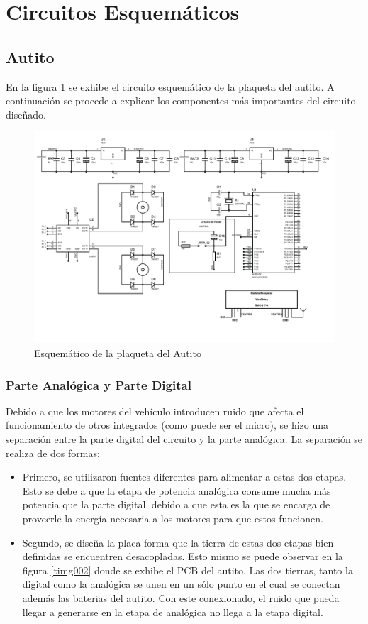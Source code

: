 \documentclass[a4paper,10pt]{article}
\begin{document}
	\section{Circuitos Esquemáticos}
		\subsection{Autito}
			En la figura \ref{timg001} se exhibe el circuito esquemático de la plaqueta del autito. A continuación se procede a explicar los componentes más 
			importantes del circuito diseñado.

			\begin{figure}[!htb]
				\centering
				\includegraphics[width=14cm]{Imagenes/EsquematicoAuto.PDF}
				\caption{Esquemático de la plaqueta del Autito} \label{timg001}
			\end{figure}

				\subsubsection{Parte Analógica y Parte Digital}
					Debido a que los motores del vehículo introducen ruido que afecta el funcionamiento de otros integrados (como puede ser el micro), se hizo una 
					separación entre la parte digital del circuito y la parte analógica. La separación se realiza de dos formas: 
			
					\begin{itemize}
						\item Primero, se utilizaron fuentes diferentes para alimentar a estas dos etapas. Esto se debe a que la etapa de potencia analógica consume
						mucha más potencia que la parte digital, debido a que esta es la que se encarga de proveerle la energía necesaria a los motores para que 
						estos funcionen.
						\item Segundo, se diseña la placa forma que la tierra de estas dos etapas bien definidas se encuentren desacopladas. Esto mismo se puede observar
						en la figura \ref{timg002} donde se exhibe el PCB del autito. Las dos tierras, tanto la digital como la analógica se unen en un sólo punto en el 
						cual se conectan además las baterias del autito. Con este conexionado, el ruido que pueda llegar a generarse en la etapa de analógica no llega a 
						la etapa digital.    
					\end{itemize}
\end{document}

